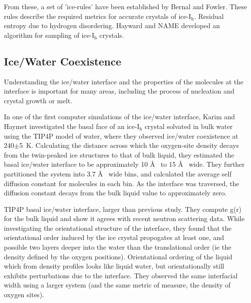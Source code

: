 From these, a set of 'ice-rules' have been established by Bernal and
Fowler.\cite{} These rules describe the required metrics for accurate
crystals of ice-I$_\mathrm{h}$. Residual entropy due to hydrogen
disordering. Hayward and NAME developed an algorithm for sampling of
ice-I$_\mathrm{h}$ crystals.\cite{HaywardXX}

\subsection{Ice/Water Coexistence}
Understanding the ice/water interface and the properties of the
molecules at the interface is important for many areas, including the
process of nucleation and crystal growth or melt. 

In one of the first computer simulations of the ice/water interface,
Karim and Haymet investigated the basal face of an ice-I$_\mathrm{h}$
crystal solvated in bulk water using the TIP4P model of water, where
they observed ice/water coexistence at 240$\pm$5~K. Calculating the
distance across which the oxygen-site density decays from the
twin-peaked ice structures to that of bulk liquid, they estimated the
basal ice/water interface to be approximately 10 \AA~ to 15 \AA~
wide. They further partitioned the system into 3.7 \AA~ wide bins, and
calculated the average self diffusion constant for molecules in each
bin. As the interface was traversed, the diffusion constant decays
from the bulk liquid value to approximately zero.

TIP4P basal ice/water interface, larger than previous study. They
compute g(r) for the bulk liquid and show it agrees with recent
neutron scattering data.  While investigating the orientational
structure of the interface, they found that the orientational order
induced by the ice crystal propogates at least one, and possible two
layers deeper into the water than the translational order (ie the
density defined by the oxygen positions). Orientational ordering of
the liquid which from density profiles looks like liquid water, but
orientationally still exhibits perturbations due to the
interface. They observed the same interfacial width using a larger
system (and the same metric of measure, the density of oxygen sites).


